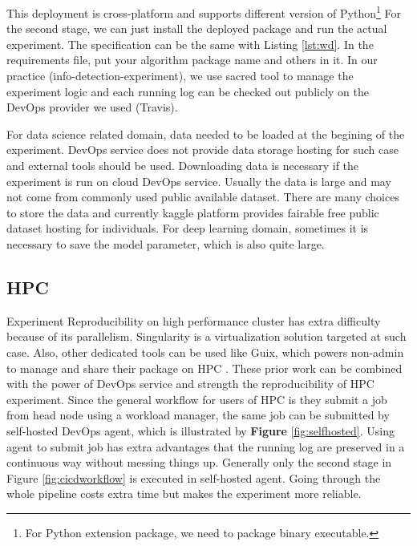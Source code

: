 \documentclass{IEEEcsmag}
\begin{document}
This deployment is cross-platform and supports different version of Python\footnote{For Python extension package, we need to package binary executable.} For the second stage, we can just install the deployed package and run the actual experiment. The specification can be the same with Listing \ref{lst:wd}. In the requirements file, put your algorithm package name and others in it. In our practice (info-detection-experiment), we use sacred tool \cite{greff2017sacred} to manage the experiment logic and each running log can be checked out publicly on the DevOps provider we used (Travis).

For data science related domain, data needed to be loaded at the begining of the experiment. DevOps service does not provide data storage hosting for such case and external tools should be used. Downloading data is necessary if the experiment is run on cloud DevOps service. Usually the data is large and may not come from commonly used public available dataset. There are many choices to store the data and currently \textrm{kaggle} platform provides fairable free public dataset hosting for individuals.
For deep learning domain, sometimes it is necessary to save the model parameter, which is also quite large.

\subsection{HPC}
Experiment Reproducibility on high performance cluster has extra difficulty because of its parallelism. Singularity is a virtualization solution targeted at such case. %
Also, other dedicated tools can be used like Guix, which powers non-admin to manage and share their package on HPC \cite{courtes2015reproducible}. These prior work can be combined with the power of DevOps service and strength the reproducibility of HPC experiment. Since the general workflow for users of HPC is they submit a job from head node using a workload manager, the same job can be submitted by self-hosted DevOps agent, which is illustrated by {\bf Figure} \ref{fig:selfhosted}. Using agent to submit job has extra advantages that the running log are preserved in a continuous way without messing things up. Generally only the second stage in Figure \ref{fig:cicdworkflow}
is executed in self-hosted agent. Going through the whole pipeline costs extra time but makes the experiment more reliable.
\end{document}
